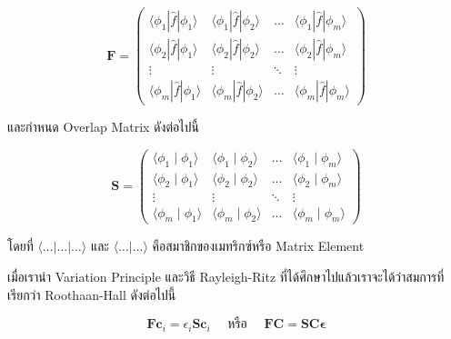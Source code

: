 \begin{equation}
  \bm{F}
  = \left(
  \begin{array}{cccc}
      \langle\phi_1|\hat{f}| \phi_1\rangle & \langle\phi_1|\hat{f}| \phi_2\rangle &
      \ldots                               & \langle\phi_1|\hat{f}| \phi_m\rangle                   \\
      \langle\phi_2|\hat{f}| \phi_1\rangle & \langle\phi_2|\hat{f}| \phi_2\rangle &
      \ldots                               & \langle\phi_2|\hat{f}| \phi_m\rangle                   \\
      \vdots                               & \vdots                               & \ddots & \vdots \\
      \langle\phi_m|\hat{f}| \phi_1\rangle & \langle\phi_m|\hat{f}| \phi_2\rangle &
      \ldots                               & \langle\phi_m|\hat{f}| \phi_m\rangle
    \end{array}
  \right)
\end{equation}

\noindent และกำหนด Overlap Matrix ดังต่อไปนี้

\begin{equation}
  \bm{S}
  =
  \left(
  \begin{array}{cccc}
      \langle\phi_1 \mid \phi_1\rangle & \langle\phi_1 \mid \phi_2\rangle &
      \ldots                           & \langle\phi_1 \mid \phi_m\rangle                   \\
      \langle\phi_2 \mid \phi_1\rangle & \langle\phi_2 \mid \phi_2\rangle &
      \ldots                           & \langle\phi_2 \mid \phi_m\rangle                   \\
      \vdots                           & \vdots                           & \ddots & \vdots \\
      \langle\phi_m \mid \phi_1\rangle & \langle\phi_m \mid \phi_2\rangle &
      \ldots                           & \langle\phi_m \mid \phi_m\rangle
    \end{array}
  \right)
\end{equation}

\noindent โดยที่ $\langle \dots | \dots | \dots \rangle$ และ $\langle \dots | \dots \rangle$
คือสมาชิกของเมทริกซ์หรือ Matrix Element

เมื่อเรานำ Variation Principle และวิธี Rayleigh-Ritz ที่ได้ศึกษาไปแล้วเราจะได้ว่าสมการที่เรียกว่า Roothaan-Hall ดังต่อไปนี้

\begin{equation}
  \label{eq:Roothaan_Hall_equation}
  \bm{F c}_i
  =
  \epsilon_i \bm{S c}_i \quad
  \text{ หรือ } \quad
  \bm{FC} = \bm{S C} \boldsymbol{\epsilon}
\end{equation}

